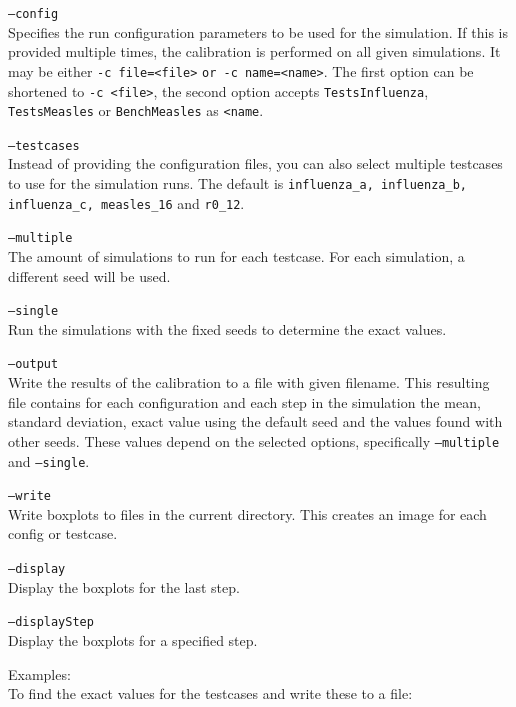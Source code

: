 \begin{compactdesc}
    \item[\texttt{--config}] \ \\
        Specifies the run configuration parameters to be used for the simulation.
        If this is provided multiple times, the calibration is performed on all given simulations.
        It may be either \texttt{-c file=<file>} \texttt{or -c name=<name>}.
        The first option can be shortened to \texttt{-c <file>}, the second option accepts \texttt{TestsInfluenza}, \texttt{TestsMeasles} or \texttt{BenchMeasles} as  \texttt{<name}.
    \item[\texttt{--testcases}] \ \\
        Instead of providing the configuration files, you can also select multiple testcases to use for the simulation runs.
        The default is \texttt{influenza\_a, influenza\_b, influenza\_c, measles\_16} and \texttt{r0\_12}.
    \item[\texttt{--multiple}]\ \\
        The amount of simulations to run for each testcase. For each simulation, a different seed will be used.
    \item[\texttt{--single}]\ \\
        Run the simulations with the fixed seeds to determine the exact values.
    \item[\texttt{--output}]\ \\
        Write the results of the calibration to a file with given filename.
        This resulting file contains for each configuration and each step in the simulation the mean, standard deviation, exact value using the default seed and the values found with other seeds.
        These values depend on the selected options, specifically \texttt{--multiple} and \texttt{--single}.
    \item[\texttt{--write}]\ \\
        Write boxplots to files in the current directory. This creates an image for each config or testcase.
    \item[\texttt{--display}]\ \\
        Display the boxplots for the last step.
    \item[\texttt{--displayStep}]\ \\
        Display the boxplots for a specified step.
\end{compactdesc}

Examples:\\
To find the exact values for the testcases and write these to a file:\\

